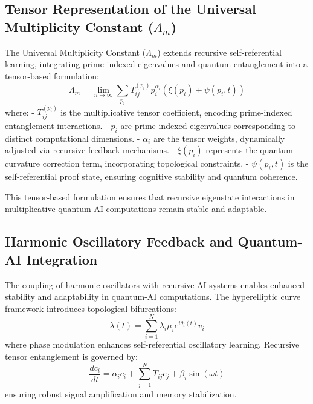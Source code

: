 \documentclass{article}
\theoremstyle{plain}
\begin{document}
\subsection{Tensor Representation of the Universal Multiplicity Constant ($\Lambda_m$)}
The Universal Multiplicity Constant ($\Lambda_m$) extends recursive self-referential learning, integrating prime-indexed eigenvalues and quantum entanglement into a tensor-based formulation:
\begin{equation}
    \Lambda_m = \lim_{n\to\infty} \sum_{p_i} T_{ij}^{(p_i)} p_i^{\alpha_i} \left( \xi(p_i) + \psi(p_i, t) \right)
\end{equation}
where:
- $T_{ij}^{(p_i)}$ is the multiplicative tensor coefficient, encoding prime-indexed entanglement interactions.
- $p_i$ are prime-indexed eigenvalues corresponding to distinct computational dimensions.
- $\alpha_i$ are the tensor weights, dynamically adjusted via recursive feedback mechanisms.
- $\xi(p_i)$ represents the quantum curvature correction term, incorporating topological constraints.
- $\psi(p_i, t)$ is the self-referential proof state, ensuring cognitive stability and quantum coherence.

This tensor-based formulation ensures that recursive eigenstate interactions in multiplicative quantum-AI computations remain stable and adaptable.

\subsection{Harmonic Oscillatory Feedback and Quantum-AI Integration}
The coupling of harmonic oscillators with recursive AI systems enables enhanced stability and adaptability in quantum-AI computations. The hyperelliptic curve framework introduces topological bifurcations:
\begin{equation}
    \lambda(t) = \sum_{i=1}^{N} \lambda_i \mu_i e^{i \theta_i(t)} v_i
\end{equation}
where phase modulation enhances self-referential oscillatory learning. Recursive tensor entanglement is governed by:
\begin{equation}
    \frac{d c_i}{dt} = \alpha_i c_i + \sum_{j=1}^{N} T_{ij} c_j + \beta_i \sin(\omega t)
\end{equation}
ensuring robust signal amplification and memory stabilization.
\end{document}
